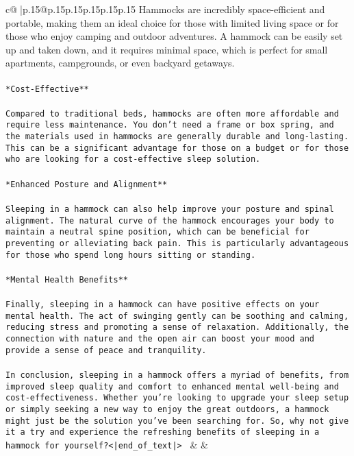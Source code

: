 \documentclass{article}
\begin{document}
{\begin{supertabular}{c@{$\;$}|p{.15\linewidth}@{}p{.15\linewidth}p{.15\linewidth}p{.15\linewidth}p{.15\linewidth}p{.15\linewidth}}
{{{Hammocks are incredibly space-efficient and portable, making them an ideal choice for those with limited living space or for those who enjoy camping and outdoor adventures. A hammock can be easily set up and taken down, and it requires minimal space, which is perfect for small apartments, campgrounds, or even backyard getaways.\\ \tt \\ \tt **Cost-Effective**\\ \tt \\ \tt Compared to traditional beds, hammocks are often more affordable and require less maintenance. You don't need a frame or box spring, and the materials used in hammocks are generally durable and long-lasting. This can be a significant advantage for those on a budget or for those who are looking for a cost-effective sleep solution.\\ \tt \\ \tt **Enhanced Posture and Alignment**\\ \tt \\ \tt Sleeping in a hammock can also help improve your posture and spinal alignment. The natural curve of the hammock encourages your body to maintain a neutral spine position, which can be beneficial for preventing or alleviating back pain. This is particularly advantageous for those who spend long hours sitting or standing.\\ \tt \\ \tt **Mental Health Benefits**\\ \tt \\ \tt Finally, sleeping in a hammock can have positive effects on your mental health. The act of swinging gently can be soothing and calming, reducing stress and promoting a sense of relaxation. Additionally, the connection with nature and the open air can boost your mood and provide a sense of peace and tranquility.\\ \tt \\ \tt In conclusion, sleeping in a hammock offers a myriad of benefits, from improved sleep quality and comfort to enhanced mental well-being and cost-effectiveness. Whether you're looking to upgrade your sleep setup or simply seeking a new way to enjoy the great outdoors, a hammock might just be the solution you've been searching for. So, why not give it a try and experience the refreshing benefits of sleeping in a hammock for yourself?<|end_of_text|> 
	  } 
	   } 
	   } 
	 & & \\ 
 

    \theutterance {}  


\end{supertabular}}
\end{document}
